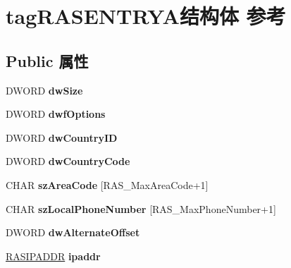 \hypertarget{structtag_r_a_s_e_n_t_r_y_a}{}\section{tag\+R\+A\+S\+E\+N\+T\+R\+Y\+A结构体 参考}
\label{structtag_r_a_s_e_n_t_r_y_a}
\subsection*{Public 属性}
\begin{DoxyCompactItemize}
\item 
\mbox{\label{structtag_r_a_s_e_n_t_r_y_a_a592583864dce03c72e6baa1a9b093c37}} 
D\+W\+O\+RD {\bfseries dw\+Size}
\item 
\mbox{\label{structtag_r_a_s_e_n_t_r_y_a_a5c6e4f713d09d3331b90cfd27c68ec76}} 
D\+W\+O\+RD {\bfseries dwf\+Options}
\item 
\mbox{\label{structtag_r_a_s_e_n_t_r_y_a_a6f28febf73154ee5d8675c49c7af66e4}} 
D\+W\+O\+RD {\bfseries dw\+Country\+ID}
\item 
\mbox{\label{structtag_r_a_s_e_n_t_r_y_a_a6663638d8ec72f0166a77e7a0474678d}} 
D\+W\+O\+RD {\bfseries dw\+Country\+Code}
\item 
\mbox{\label{structtag_r_a_s_e_n_t_r_y_a_af80a74bac925d55f814dd26745e459f1}} 
C\+H\+AR {\bfseries sz\+Area\+Code} \mbox{[}R\+A\+S\+\_\+\+Max\+Area\+Code+1\mbox{]}
\item 
\mbox{\label{structtag_r_a_s_e_n_t_r_y_a_abdfbde67fd26b8e81c5f6e0d9f45aa8a}} 
C\+H\+AR {\bfseries sz\+Local\+Phone\+Number} \mbox{[}R\+A\+S\+\_\+\+Max\+Phone\+Number+1\mbox{]}
\item 
\mbox{\label{structtag_r_a_s_e_n_t_r_y_a_a13a9310edd5bdd99a9d6f3a0109c45dd}} 
D\+W\+O\+RD {\bfseries dw\+Alternate\+Offset}
\item 
\mbox{\label{structtag_r_a_s_e_n_t_r_y_a_a960db50302f255b60d106196fd6ca7a3}} 
\hyperlink{structtag_r_a_s_i_p_a_d_d_r}{R\+A\+S\+I\+P\+A\+D\+DR} {\bfseries ipaddr}

\end{DoxyCompactItemize}

